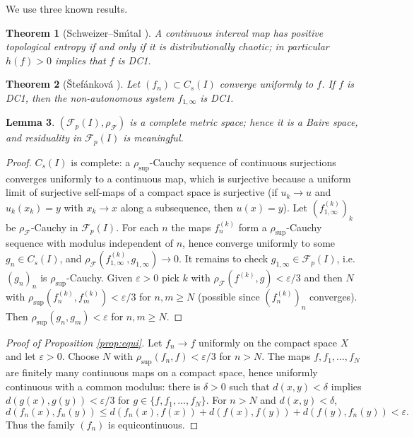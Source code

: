 \documentclass[11pt]{article}
\newtheorem{theorem}{Theorem}[section]
\newtheorem{lemma}[theorem]{Lemma}
\newcommand{\I}{I}
\newcommand{\Cs}{C_s(\I)}
\newcommand{\Fp}{\mathcal F_p(\I)}
\newcommand{\rsup}{\rho_{\sup}}
\newcommand{\rF}{\rho_{\mathcal F}}
\begin{document}
We use three known results.

\begin{theorem}[{Schweizer--Sm\'\i tal \cite{SS}}]\label{thm:ss}
A continuous interval map has positive topological entropy if and only if it is
distributionally chaotic; in particular $h(f)>0$ implies that $f$ is DC1.
\end{theorem}

\begin{theorem}[{\v Stef\'ankov\'a \cite{Stefankova}}]\label{thm:stef}
Let $(f_n)\subset\Cs$ converge uniformly to $f$.  If $f$ is DC1, then the
non-autonomous system $f_{1,\infty}$ is DC1.
\end{theorem}

\begin{lemma}\label{lem:complete}
$(\Fp,\rF)$ is a complete metric space; hence it is a Baire space, and residuality
in $\Fp$ is meaningful.
\end{lemma}

\begin{proof}
$\Cs$ is complete: a $\rsup$-Cauchy sequence of continuous surjections converges
uniformly to a continuous map, which is surjective because a uniform limit of
surjective self-maps of a compact space is surjective (if $u_k\to u$ and
$u_k(x_k)=y$ with $x_k\to x$ along a subsequence, then $u(x)=y$).  Let
$(f^{(k)}_{1,\infty})_k$ be $\rF$-Cauchy in $\Fp$.  For each $n$ the maps
$f^{(k)}_n$ form a $\rsup$-Cauchy sequence with modulus independent of $n$, hence
converge uniformly to some $g_n\in\Cs$, and $\rF(f^{(k)}_{1,\infty},g_{1,\infty})\to0$.
It remains to check $g_{1,\infty}\in\Fp$, i.e.\ $(g_n)_n$ is $\rsup$-Cauchy.  Given
$\varepsilon>0$ pick $k$ with $\rF(f^{(k)},g)<\varepsilon/3$ and then $N$ with
$\rsup(f^{(k)}_n,f^{(k)}_m)<\varepsilon/3$ for $n,m\ge N$ (possible since
$(f^{(k)}_n)_n$ converges).  Then
$\rsup(g_n,g_m)<\varepsilon$ for $n,m\ge N$.
\end{proof}

\begin{proof}[Proof of Proposition \ref{prop:equi}]
Let $f_n\to f$ uniformly on the compact space $X$ and let $\varepsilon>0$.  Choose
$N$ with $\rsup(f_n,f)<\varepsilon/3$ for $n>N$.  The maps $f,f_1,\dots,f_N$ are
finitely many continuous maps on a compact space, hence uniformly continuous with a
common modulus: there is $\delta>0$ such that $d(x,y)<\delta$ implies
$d(g(x),g(y))<\varepsilon/3$ for $g\in\{f,f_1,\dots,f_N\}$.  For $n>N$ and
$d(x,y)<\delta$,
\[
d(f_n(x),f_n(y))\le d(f_n(x),f(x))+d(f(x),f(y))+d(f(y),f_n(y))<\varepsilon .
\]
Thus the family $(f_n)$ is equicontinuous.
\end{proof}
\end{document}
